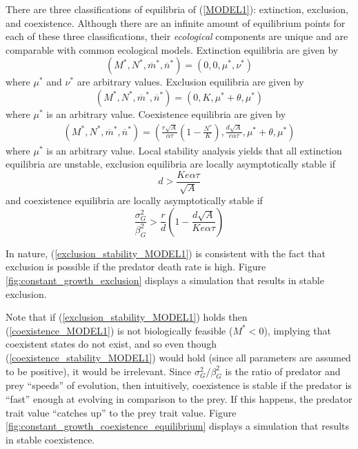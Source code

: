 \documentclass{amsart}
\theoremstyle{definition}
\theoremstyle{remark}
\numberwithin{equation}{section}
\begin{document}
There are three classifications of equilibria of (\ref{MODEL1}): extinction, exclusion, and coexistence.  Although there are an infinite amount of equilibrium points for each of these three classifications, their {\it ecological} components are unique and are comparable with common ecological models.  Extinction equilibria are given by
\begin{equation}
	\label{extinction_MODEL1}
	(M^*, N^*, \overline{m}^*, \overline{n}^*) = (0, 0, \mu^*, \nu^*)
\end{equation}
where $\mu^*$ and $\nu^*$ are arbitrary values.  Exclusion equilibria are given by
\begin{equation}
	\label{exclusion_MODEL1}
	(M^*, N^*, \overline{m}^*, \overline{n}^*) = (0, K, \mu^* + \theta, \mu^*)
\end{equation}
where $\mu^*$ is an arbitrary value.  Coexistence equilibria are given by
\begin{equation}
	\label{coexistence_MODEL1}
	\begin{aligned}
		(M^*, N^*, \overline{m}^*, \overline{n}^*) = \left(\frac{r\sqrt{A}}{\alpha\tau}\left(1 - \frac{N^*}{K}\right), \frac{d\sqrt{A}}{e\alpha\tau}, \mu^* + \theta, \mu^*\right)
	\end{aligned}
\end{equation}
where $\mu^*$ is an arbitrary value.  Local stability analysis yields that all extinction equilibria are unstable, exclusion equilibria are locally asymptotically stable if
\begin{equation}
	\label{exclusion_stability_MODEL1}
	d > \frac{Ke\alpha\tau}{\sqrt{A}}
\end{equation}
and coexistence equilibria are locally asymptotically stable if
\begin{equation}
	\label{coexistence_stability_MODEL1}
	\frac{\sigma_G^2}{\beta_G^2} > \frac{r}{d}\left(1 - \frac{d\sqrt{A}}{Ke\alpha\tau}\right)
\end{equation}

In nature, (\ref{exclusion_stability_MODEL1}) is consistent with the fact that exclusion is possible if the predator death rate is high.  Figure \ref{fig:constant_growth_exclusion} displays a simulation that results in stable exclusion.

Note that if (\ref{exclusion_stability_MODEL1}) holds then (\ref{coexistence_MODEL1}) is not biologically feasible ($M^* < 0$), implying that coexistent states do not exist, and so even though (\ref{coexistence_stability_MODEL1}) would hold (since all parameters are assumed to be positive), it would be irrelevant.  Since $\sigma_G^2/\beta_G^2$ is the ratio of predator and prey ``speeds'' of evolution, then intuitively, coexistence is stable if the predator is ``fast'' enough at evolving in comparison to the prey.  If this happens, the predator trait value ``catches up'' to the prey trait value.  Figure \ref{fig:constant_growth_coexistence_equilibrium} displays a simulation that results in stable coexistence.
\end{document}
